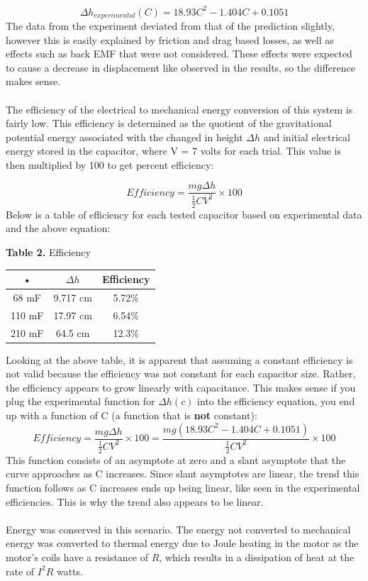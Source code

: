\documentclass[12pt,letterpaper]{article}
\begin{document}
\begin{equation}
\Delta h_{experimental}(C) = 18.93C^2 - 1.404C + 0.1051
\end{equation} 
The data from the experiment deviated from that of the prediction slightly, however this is easily explained by friction and drag based losses, as well as effects such as back EMF that were not considered. These effects were expected to cause a decrease in displacement like observed in the results, so the difference makes sense.
\\\\
The efficiency of the electrical to mechanical energy conversion of this system is fairly low. This efficiency is determined as the quotient of the gravitational potential energy associated with the changed in height $\Delta h$ and initial electrical energy stored in the capacitor, where V = 7 volts for each trial. This value is then multiplied by 100 to get percent efficiency:

\begin{equation}
Efficiency = \frac{mg\Delta h}{\frac{1}{2}CV^2}\times 100
\end{equation}
Below is a table of efficiency for each tested capacitor based on experimental data and the above equation:
\begin{center}
\textbf{Table 2.} Efficiency\\
\begin{tabular}{|c|c|c|}
\hline 
• & $\Delta h$ & Efficiency \\ 
\hline 
68 mF & 9.717 cm & 5.72\% \\ 
\hline 
110 mF & 17.97 cm & 6.54\% \\ 
\hline 
210 mF & 64.5 cm & 12.3\% \\ 
\hline 
\end{tabular} 
\end{center}
Looking at the above table, it is apparent that assuming a constant efficiency is not valid because the efficiency was not constant for each capacitor size. Rather, the efficiency appears to grow linearly with capacitance. This makes sense if you plug the experimental function for $\Delta h(c)$ into the efficiency equation, you end up with a function of C (a function that is \textbf{not} constant):
\begin{equation}
Efficiency = \frac{mg\Delta h}{\frac{1}{2}CV^2}\times 100 = \frac{mg(18.93C^2 - 1.404C + 0.1051)}{\frac{1}{2}CV^2}\times 100
\end{equation}
This function consists of an asymptote at zero and a slant asymptote that the curve approaches as C increases. Since slant asymptotes are linear, the trend this function follows as C increases ends up being linear, like seen in the experimental efficiencies. This is why the trend also appears to be linear. 
\\\\Energy was conserved in this scenario. The energy not converted to mechanical energy was converted to thermal energy due to Joule heating in the motor as the motor's coils have a resistance of $R$, which results in a dissipation of heat at the rate of $I^2R$ watts.
\end{document}
